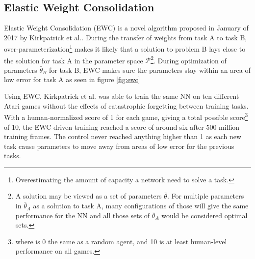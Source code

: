 \subsection{Elastic Weight Consolidation}
Elastic Weight Consolidation (EWC) is a novel algorithm proposed in January of 2017 by Kirkpatrick et al.\cite{ewc}. During the transfer of weights from task A to task B, over-parameterization\footnote{Overestimating the amount of capacity a network need to solve a task.} makes it likely that a solution to problem B lays close to the solution for task A in the parameter space \(\mathcal{P}\)\footnote{A solution may be viewed as a set of parameters \(\bar{\theta}\). For multiple parameters in \(\bar{\theta}_{A}\) as a solution to task A, many configurations of those will give the same performance for the NN and all those sets of \(\bar{\theta}_{A}\) would be considered optimal sets.}. During optimization of parameters \(\bar{\theta}_{B}\) for task B, EWC makes sure the parameters stay within an area of low error for task A as seen in figure \ref{fig:ewc}

Using EWC, Kirkpatrick et al.\cite{ewc} was able to train the same NN on ten different Atari games without the effects of catastrophic forgetting between training tasks. With a human-normalized score of 1 for each game, giving a total possible score\footnote{where is 0 the same as a random agent, and 10 is at least human-level performance on all games.} of 10, the EWC driven training reached a score of around six after 500 million training frames. The control never reached anything higher than 1 as each new task cause parameters to move away from areas of low error for the previous tasks.
\fi


